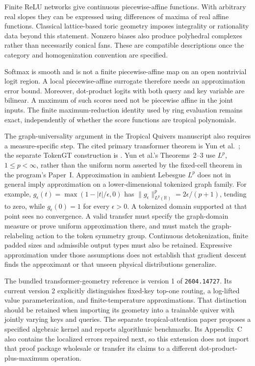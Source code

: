 Finite ReLU networks give continuous piecewise-affine functions. With
arbitrary real slopes they can be expressed using differences of maxima of
real affine functions. Classical lattice-based toric geometry imposes
integrality or rationality data beyond this statement. Nonzero biases also
produce polyhedral complexes rather than necessarily conical fans. These
are compatible descriptions once the category and homogenization convention
are specified.

Softmax is smooth and is not a finite piecewise-affine map on an open
nontrivial logit region. A local piecewise-affine surrogate therefore needs
an approximation error bound. Moreover, dot-product logits with both query
and key variable are bilinear. A maximum of such scores need not be
piecewise affine in the joint inputs. The finite maximum-reduction identity
used by ring evaluation remains exact, independently of whether the score
functions are tropical polynomials.

The graph-universality argument in the Tropical Quivers manuscript also
requires a measure-specific step. The cited primary transformer theorem
is Yun et al.~\cite{ToricAuditYun2020}; the separate TokenGT construction is
\citet{ToricAuditTokenGT2022}. Yun et al.'s Theorems~2--3 use
$L^p$, $1\le p<\infty$, rather than the uniform norm asserted by the
fixed-cell theorem in the program's Paper~I.
Approximation in ambient Lebesgue
$L^p$ does not in general imply approximation on a lower-dimensional
tokenized graph family. For example,
$g_\epsilon(t)=\max(1-|t|/\epsilon,0)$ has
$\|g_\epsilon\|_{L^p(\mathbb R)}^p=2\epsilon/(p+1)$, tending to zero,
while $g_\epsilon(0)=1$ for every $\epsilon>0$. A tokenized domain supported
at that point sees no convergence. A valid transfer must specify the
graph-domain measure or prove uniform approximation there, and must match
the graph-relabeling action to the token symmetry group. Continuous
detokenization, finite padded sizes and admissible output types must also
be retained. Expressive approximation under those assumptions does not
establish that gradient descent finds the approximant or that unseen
physical distributions generalize.

The bundled transformer-geometry reference is version 1 of
\texttt{2604.14727}. Its current version 2 \cite{ToricAuditSuLiu2026}
explicitly distinguishes fixed-key
top-one routing, a log-lifted value parameterization, and finite-temperature
approximations.
That distinction should be retained when importing its geometry into a
trainable quiver with jointly varying keys and queries. The separate
tropical-attention paper \cite{ToricAuditHashemi2025} proposes a specified
algebraic kernel and reports algorithmic benchmarks. Its Appendix~C also
contains the localized errors repaired next, so this extension does not
import that proof package wholesale or transfer its claims to a different
dot-product-plus-maximum operation.

